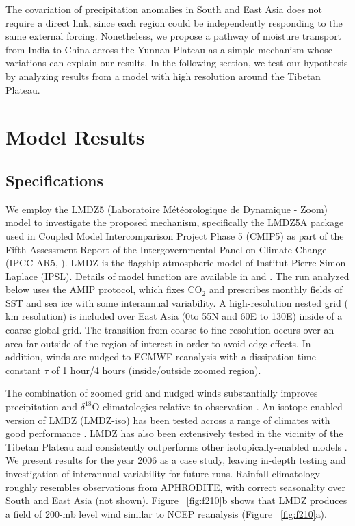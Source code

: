 	The covariation of precipitation anomalies in South and East Asia does not require a direct link, since each region could be independently responding to the same external forcing. Nonetheless, we propose a pathway of moisture transport from India to China across the Yunnan Plateau as a simple mechanism whose variations can explain our results.  In the following section, we test our hypothesis by analyzing results from a model with high resolution around the Tibetan Plateau.

\section{Model Results}

\subsection{Specifications}
	
	We employ the LMDZ5 (Laboratoire M\'et\'eorologique de Dynamique - Zoom) model to investigate the proposed mechanism, specifically the LMDZ5A package used in Coupled Model Intercomparison Project Phase 5 (CMIP5) as part of the Fifth Assessment Report of the Intergovernmental Panel on Climate Change (IPCC AR5, \cite{Christensen2011}). LMDZ is the flagship atmospheric model of Institut Pierre Simon Laplace (IPSL). Details of model function are available in \cite{Hourdin2006} and \cite{Hourdin2012}. The run analyzed below uses the AMIP protocol, which fixes CO$_\mathrm{2}$ and prescribes monthly fields of SST and sea ice with some interannual variability. A high-resolution nested grid ( km resolution) is included over East Asia (0\textdegree to 55\textdegree N and 60\textdegree E to 130\textdegree E) inside of a coarse global grid. The transition from coarse to fine resolution occurs over an area far outside of the region of interest in order to avoid edge effects. In addition, winds are nudged to ECMWF reanalysis with a dissipation time constant $\tau$ of 1 hour/4 hours (inside/outside zoomed region). 
	
	The combination of zoomed grid and nudged winds substantially improves precipitation and $\delta^{18}$O climatologies relative to observation \citep{Gao2011}. An isotope-enabled version of LMDZ (LMDZ-iso) has been tested across a range of climates with good performance \citep{Risi2010}. LMDZ has also been extensively tested in the vicinity of the Tibetan Plateau and consistently outperforms other isotopically-enabled models \citep{Gao2011,Lee2012,Eagle2013,Gao2013,Yao2013}. We present results for the year 2006 as a case study, leaving in-depth testing and investigation of interannual variability for future runs. Rainfall climatology roughly resembles observations from APHRODITE, with correct seasonality over South and East Asia (not shown). Figure ~\ref{fig:f210}b shows that LMDZ produces a field of 200-mb level wind similar to NCEP reanalysis (Figure ~\ref{fig:f210}a).
	
